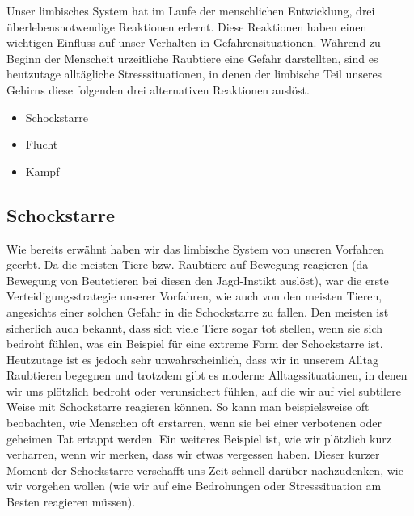 Unser limbisches System hat im Laufe der menschlichen Entwicklung, drei überlebensnotwendige Reaktionen erlernt.
Diese Reaktionen haben einen wichtigen Einfluss auf unser Verhalten in Gefahrensituationen. 
Während zu Beginn der Menscheit urzeitliche Raubtiere eine Gefahr darstellten, sind es heutzutage alltägliche Stresssituationen, in denen 
der limbische Teil unseres Gehirns diese folgenden drei alternativen Reaktionen auslöst.

\begin{itemize}
    \item Schockstarre
    \item Flucht
    \item Kampf
\end{itemize}

\subsection{Schockstarre}
Wie bereits erwähnt haben wir das limbische System von unseren Vorfahren geerbt. Da die meisten Tiere bzw.
Raubtiere auf Bewegung reagieren (da Bewegung von Beutetieren bei diesen den Jagd-Instikt auslöst), war
die erste Verteidigungsstrategie unserer Vorfahren, wie auch von den meisten Tieren, angesichts einer solchen Gefahr in die Schockstarre 
zu fallen. Den meisten ist sicherlich auch bekannt, dass sich viele Tiere sogar tot stellen, wenn sie sich bedroht fühlen,
was ein Beispiel für eine extreme Form der Schockstarre ist. 
Heutzutage ist es jedoch sehr unwahrscheinlich, dass wir in unserem Alltag Raubtieren begegnen und trotzdem
gibt es moderne Alltagssituationen, in denen wir uns plötzlich bedroht oder verunsichert fühlen, auf die wir auf viel
subtilere Weise mit Schockstarre reagieren können. 
So kann man beispielsweise oft beobachten, wie Menschen oft erstarren, wenn sie bei einer
verbotenen oder geheimen Tat ertappt werden. Ein weiteres Beispiel ist, wie wir plötzlich kurz verharren, wenn wir
merken, dass wir etwas vergessen haben. Dieser kurzer Moment der Schockstarre verschafft uns Zeit schnell darüber nachzudenken,
wie wir vorgehen wollen (wie wir auf eine Bedrohungen oder Stresssituation am Besten reagieren müssen). 


